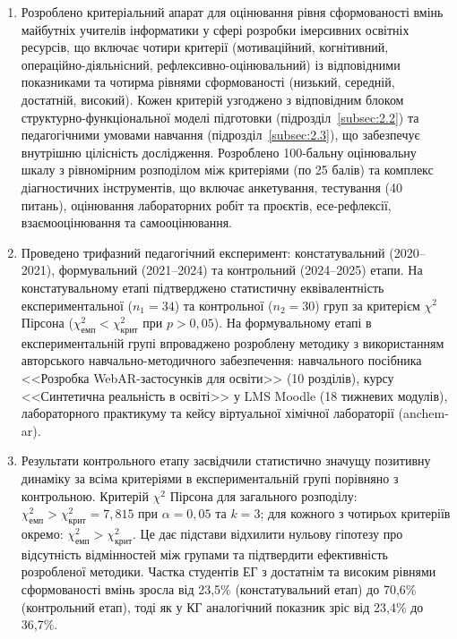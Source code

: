 \begin{enumerate}[label=\arabic*.]
\item Розроблено критеріальний апарат для оцінювання рівня сформованості вмінь майбутніх учителів інформатики у сфері розробки імерсивних освітніх ресурсів, що включає чотири критерії (мотиваційний, когнітивний, операційно-діяльнісний, рефлексивно-оцінювальний) із відповідними показниками та чотирма рівнями сформованості (низький, середній, достатній, високий). Кожен критерій узгоджено з відповідним блоком структурно-функціональної моделі підготовки (підрозділ~\ref{subsec:2.2}) та педагогічними умовами навчання (підрозділ~\ref{subsec:2.3}), що забезпечує внутрішню цілісність дослідження. Розроблено 100-бальну оцінювальну шкалу з рівномірним розподілом між критеріями (по 25 балів) та комплекс діагностичних інструментів, що включає анкетування, тестування (40 питань), оцінювання лабораторних робіт та проєктів, есе-рефлексії, взаємооцінювання та самооцінювання.

\item Проведено трифазний педагогічний експеримент: констатувальний (2020--2021), формувальний (2021--2024) та контрольний (2024--2025) етапи. На констатувальному етапі підтверджено статистичну еквівалентність експериментальної ($n_1 = 34$) та контрольної ($n_2 = 30$) груп за критерієм $\chi^2$ Пірсона ($\chi^2_{\text{емп}} < \chi^2_{\text{крит}}$ при $p > 0{,}05$). На формувальному етапі в експериментальній групі впроваджено розроблену методику з використанням авторського навчально-методичного забезпечення: навчального посібника <<Розробка WebAR-застосунків для освіти>> (10 розділів), курсу <<Синтетична реальність в освіті>> у LMS Moodle (18 тижневих модулів), лабораторного практикуму та кейсу віртуальної хімічної лабораторії (anchem-ar).

\item Результати контрольного етапу засвідчили статистично значущу позитивну динаміку за всіма критеріями в експериментальній групі порівняно з контрольною. Критерій $\chi^2$ Пірсона для загального розподілу: $\chi^2_{\text{емп}} > \chi^2_{\text{крит}} = 7{,}815$ при $\alpha = 0{,}05$ та $k = 3$; для кожного з чотирьох критеріїв окремо: $\chi^2_{\text{емп}} > \chi^2_{\text{крит}}$. Це дає підстави відхилити нульову гіпотезу про відсутність відмінностей між групами та підтвердити ефективність розробленої методики. Частка студентів ЕГ з достатнім та високим рівнями сформованості вмінь зросла від 23,5\% (констатувальний етап) до 70,6\% (контрольний етап), тоді як у КГ аналогічний показник зріс від 23,4\% до 36,7\%.


\end{enumerate}

